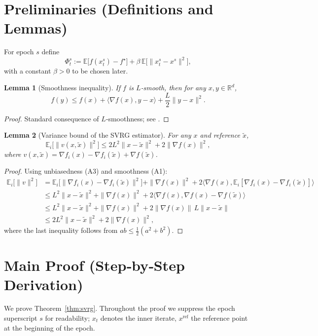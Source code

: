\documentclass{article}
\newtheorem{lemma}{Lemma}
\newcommand{\E}{\mathbb{E}}
\newcommand{\R}{\mathbb{R}}
\begin{document}
\newpage
\section*{Preliminaries (Definitions and Lemmas)}
\begin{definition}
For epoch $s$ define
\[
\Phi_t^{s}:= \E\bigl[ f(x_t^{s}) - f^\star \bigr] + \beta\,\E\bigl[\|x_t^{s}-x^{s}\|^{2}\bigr],
\]
with a constant $\beta>0$ to be chosen later.
\end{definition}

\begin{lemma}[Smoothness inequality]\label{lem:smooth}
If $f$ is $L$‑smooth, then for any $x,y\in\R^{d}$,
\[
f(y)\le f(x)+\langle\nabla f(x),y-x\rangle+\frac{L}{2}\|y-x\|^{2}.
\tag{L1}
\]
\end{lemma}
\begin{proof}
Standard consequence of $L$‑smoothness; see \cite{Nesterov2004}.
\end{proof}

\begin{lemma}[Variance bound of the SVRG estimator]\label{lem:var}
For any $x$ and reference $\tilde{x}$,
\[
\E_{i}\bigl[\|v(x,\tilde{x})\|^{2}\bigr]
\le 2L^{2}\|x-\tilde{x}\|^{2}+2\|\nabla f(x)\|^{2},
\tag{L2}
\]
where $v(x,\tilde{x})=\nabla f_i(x)-\nabla f_i(\tilde{x})+\nabla f(\tilde{x})$.
\end{lemma}
\begin{proof}
Using unbiasedness (A3) and smoothness (A1):
\[
\begin{aligned}
\E_{i}\!\bigl[\|v\|^{2}\bigr]
&= \E_{i}\!\bigl[\|\nabla f_i(x)-\nabla f_i(\tilde{x})\|^{2}\bigr]
   +\|\nabla f(x)\|^{2}
   +2\langle \nabla f(x),\E_{i}[\nabla f_i(x)-\nabla f_i(\tilde{x})]\rangle\\
&\le L^{2}\|x-\tilde{x}\|^{2}+ \|\nabla f(x)\|^{2}
   +2\langle \nabla f(x),\nabla f(x)-\nabla f(\tilde{x})\rangle\\
&\le L^{2}\|x-\tilde{x}\|^{2}+ \|\nabla f(x)\|^{2}
   +2\|\nabla f(x)\|\,L\|x-\tilde{x}\|\\
&\le 2L^{2}\|x-\tilde{x}\|^{2}+2\|\nabla f(x)\|^{2},
\end{aligned}
\]
where the last inequality follows from $ab\le \frac{1}{2}(a^{2}+b^{2})$.
\end{proof}

\section*{Main Proof (Step‑by‑Step Derivation)}
We prove Theorem~\ref{thm:svrg}. Throughout the proof we suppress the epoch superscript $s$ for readability; $x_t$ denotes the inner iterate, $x^{\text{ref}}$ the reference point at the beginning of the epoch.
\end{document}
